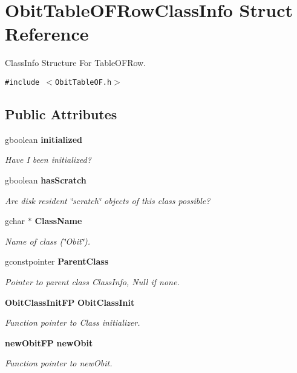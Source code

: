 \section{Obit\-Table\-OFRow\-Class\-Info Struct Reference}
\label{structObitTableOFRowClassInfo}
Class\-Info Structure For Table\-OFRow.  


{\tt \#include $<$Obit\-Table\-OF.h$>$}

\subsection*{Public Attributes}
\begin{CompactItemize}
\item 
gboolean {\bf initialized}
\begin{CompactList}\small\item\em Have I been initialized? \item\end{CompactList}\item 
gboolean {\bf has\-Scratch}
\begin{CompactList}\small\item\em Are disk resident \char`\"{}scratch\char`\"{} objects of this class possible? \item\end{CompactList}\item 
gchar $\ast$ {\bf Class\-Name}
\begin{CompactList}\small\item\em Name of class (\char`\"{}Obit\char`\"{}). \item\end{CompactList}\item 
gconstpointer {\bf Parent\-Class}
\begin{CompactList}\small\item\em Pointer to parent class Class\-Info, Null if none. \item\end{CompactList}\item 
{\bf Obit\-Class\-Init\-FP} {\bf Obit\-Class\-Init}
\begin{CompactList}\small\item\em Function pointer to Class initializer. \item\end{CompactList}\item 
{\bf new\-Obit\-FP} {\bf new\-Obit}
\begin{CompactList}\small\item\em Function pointer to new\-Obit. \item\end{CompactList}\item 

\end{CompactItemize}
